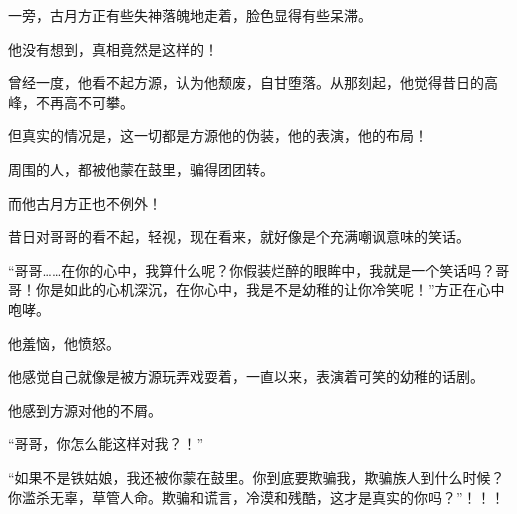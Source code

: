 \begin{this_body}
一旁，古月方正有些失神落魄地走着，脸色显得有些呆滞。

他没有想到，真相竟然是这样的！

曾经一度，他看不起方源，认为他颓废，自甘堕落。从那刻起，他觉得昔日的高峰，不再高不可攀。

但真实的情况是，这一切都是方源他的伪装，他的表演，他的布局！

周围的人，都被他蒙在鼓里，骗得团团转。

而他古月方正也不例外！

昔日对哥哥的看不起，轻视，现在看来，就好像是个充满嘲讽意味的笑话。

“哥哥……在你的心中，我算什么呢？你假装烂醉的眼眸中，我就是一个笑话吗？哥哥！你是如此的心机深沉，在你心中，我是不是幼稚的让你冷笑呢！”方正在心中咆哮。

他羞恼，他愤怒。

他感觉自己就像是被方源玩弄戏耍着，一直以来，表演着可笑的幼稚的话剧。

他感到方源对他的不屑。

“哥哥，你怎么能这样对我？！”

“如果不是铁姑娘，我还被你蒙在鼓里。你到底要欺骗我，欺骗族人到什么时候？你滥杀无辜，草管人命。欺骗和谎言，冷漠和残酷，这才是真实的你吗？”！！！

\end{this_body}


